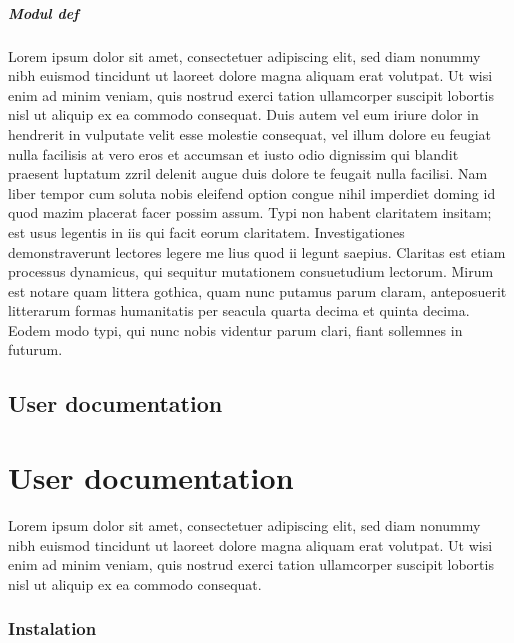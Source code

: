 \paragraph{Modul def}
Lorem ipsum dolor sit amet, consectetuer adipiscing elit, sed diam nonummy nibh euismod tincidunt ut laoreet dolore magna aliquam erat volutpat. Ut wisi enim ad minim veniam, quis nostrud exerci tation ullamcorper suscipit lobortis nisl ut aliquip ex ea commodo consequat. Duis autem vel eum iriure dolor in hendrerit in vulputate velit esse molestie consequat, vel illum dolore eu feugiat nulla facilisis at vero eros et accumsan et iusto odio dignissim qui blandit praesent luptatum zzril delenit augue duis dolore te feugait nulla facilisi. Nam liber tempor cum soluta nobis eleifend option congue nihil imperdiet doming id quod mazim placerat facer possim assum. Typi non habent claritatem insitam; est usus legentis in iis qui facit eorum claritatem. Investigationes demonstraverunt lectores legere me lius quod ii legunt saepius. Claritas est etiam processus dynamicus, qui sequitur mutationem consuetudium lectorum. Mirum est notare quam littera gothica, quam nunc putamus parum claram, anteposuerit litterarum formas humanitatis per seacula quarta decima et quinta decima. Eodem modo typi, qui nunc nobis videntur parum clari, fiant sollemnes in futurum.
\newpage
{}
{
	\section{User documentation}
}
{
	\chapter{User documentation}
}
Lorem ipsum dolor sit amet, consectetuer adipiscing elit, sed diam nonummy nibh euismod tincidunt ut laoreet dolore magna aliquam erat volutpat. Ut wisi enim ad minim veniam, quis nostrud exerci tation ullamcorper suscipit lobortis nisl ut aliquip ex ea commodo consequat.
{
	\subsection{Instalation}
}
